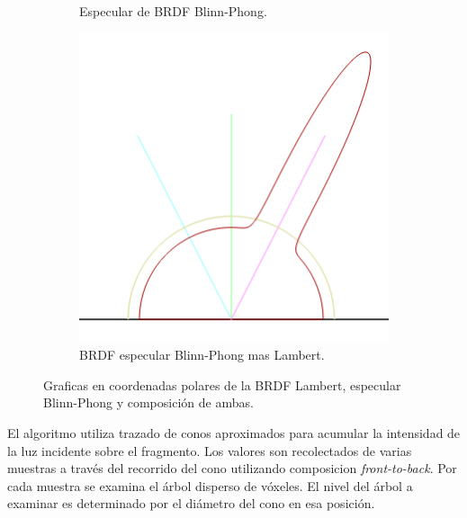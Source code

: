 \begin{figure}[H]
\begin{subfigure}[t]{.33\linewidth}
		\caption*{Especular de \ac{BRDF} Blinn-Phong.}
	\end{subfigure}\hfill
	\begin{subfigure}[t]{.33\linewidth}
		\centering
		\captionsetup{justification=centering}
		\includegraphics[width=\linewidth]{media/blinn_phong.png}
		\caption*{\ac{BRDF} especular Blinn-Phong mas Lambert.}
	\end{subfigure}
	\caption{Graficas en coordenadas polares de la BRDF Lambert, especular Blinn-Phong y composición de ambas.}
	\label{fig:brdf_cones}
\end{figure}

El algoritmo utiliza trazado de conos aproximados para acumular la intensidad de la luz incidente sobre el fragmento. Los valores son recolectados de varias muestras a través del recorrido del cono utilizando composicion \emph{front-to-back}. Por cada muestra se examina el árbol disperso de vóxeles. El nivel del árbol a examinar es determinado por el diámetro del cono en esa posición.



